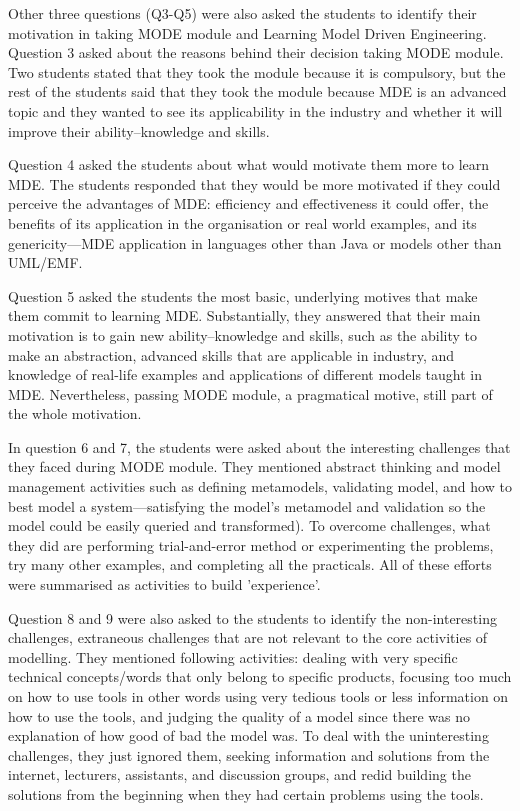 \documentclass[12pt, a4paper]{report} \usepackage[titletoc]{appendix}
\begin{document}
\begin{appendices}
Other three questions (Q3-Q5) were also asked the students to identify their motivation in taking MODE module and Learning Model Driven Engineering. Question 3 asked about the reasons behind their decision taking MODE module. Two students stated that they took the module because it is compulsory, but the rest of the students said that they took the module because MDE is an advanced topic and they wanted to see its applicability in the industry and whether it will improve their ability--knowledge and skills.

Question 4 asked the students about what would motivate them more to learn MDE. The students responded that they would be more motivated if they could perceive the advantages of MDE: efficiency and effectiveness it could offer, the benefits of its application in the organisation or real world examples, and its genericity---MDE application in languages other than Java or models other than UML/EMF.

Question 5 asked the students the most basic, underlying motives that make them commit to learning MDE. Substantially, they answered that their main motivation is to gain new ability--knowledge and skills, such as the ability to make an abstraction, advanced skills that are applicable in industry, and knowledge of real-life examples and applications of different models taught in MDE. Nevertheless, passing MODE module, a pragmatical motive, still part of the whole motivation. 

In question 6 and 7, the students were asked about the interesting challenges that they faced during MODE module. They mentioned abstract thinking and model management activities such as defining metamodels, validating model, and how to best model a system---satisfying the model's metamodel and validation so the model could be easily queried and transformed). To overcome challenges, what they did are performing trial-and-error method or experimenting the problems, try many other examples, and completing all the practicals. All of these efforts were summarised as activities to build 'experience'.

Question 8 and 9 were also asked to the students to identify the non-interesting challenges, extraneous challenges that are not relevant to the core activities of modelling. They mentioned following activities: dealing with very specific technical concepts/words that only belong to specific products, focusing too much on how to use tools in other words using very tedious tools or less information on how to use the tools, and judging the quality of a model since there was no explanation of how good of bad the model was. To deal with the uninteresting challenges, they just ignored them, seeking information and solutions from the internet, lecturers, assistants, and discussion groups, and redid building the solutions from the beginning when they had certain problems using the tools.


\end{appendices}
\end{document}
